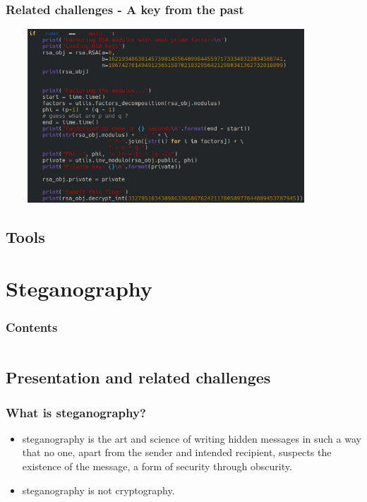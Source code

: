 \documentclass[]{beamer}
\begin{document}
\begin{frame}
\frametitle{Related challenges - A key from the past}
\begin{center}
    \includegraphics[height=6.5cm, width=12.0cm]{./images/RSA-weak-prime-factors.png}
\end{center}
\end{frame}




\subsection{Tools}



%
%
\section{Steganography}
\begin{frame}
    \frametitle{Contents}
    \begin{columns}[t]
        \begin{column}{5cm}
            \tableofcontents[sections={1-2}, currentsection, hideothersubsections]
        \end{column}
        \begin{column}{5cm}
            \tableofcontents[sections={3-4}, currentsection, hideothersubsections]
        \end{column}
    \end{columns}
\end{frame}
\subsection{Presentation and related challenges}
\begin{frame}
\frametitle{What is steganography?}
\begin{itemize}
    \item steganography is the art and science of writing hidden messages in such a way that no one, apart from the sender and intended recipient, suspects the existence of the message, a form of security through obscurity.
    \item steganography is not cryptography.
\end{itemize}
\end{frame}
\end{document}
